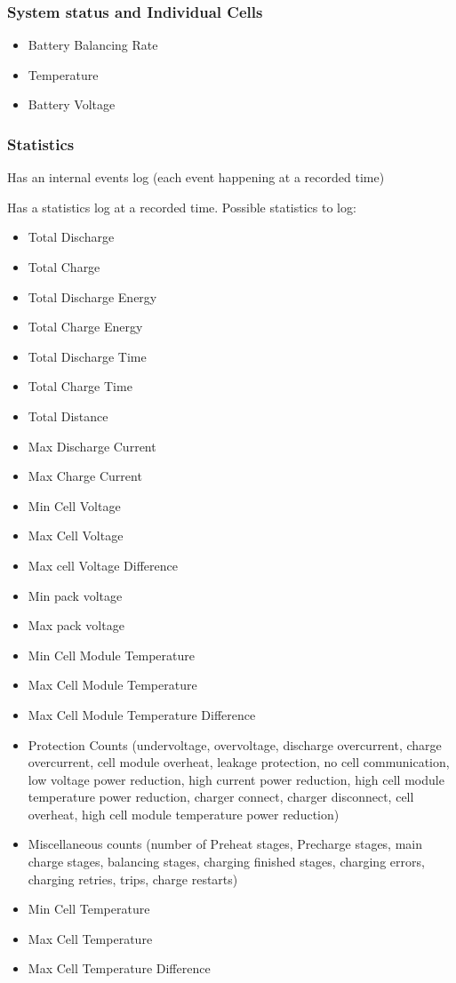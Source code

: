 \subsubsection{System status and Individual Cells}
\begin{itemize}
	\item Battery Balancing Rate
	\item Temperature
	\item Battery Voltage
\end{itemize}

\subsubsection{Statistics}
Has an internal events log (each event happening at a recorded time)

Has a statistics log at a recorded time. Possible statistics to log:
\begin{itemize}
	\item Total Discharge
	\item Total Charge
	\item Total Discharge Energy
	\item Total Charge Energy
	\item Total Discharge Time
	\item Total Charge Time
	\item Total Distance
	\item Max Discharge Current
	\item Max Charge Current
	\item Min Cell Voltage
	\item Max Cell Voltage
	\item Max cell Voltage Difference
	\item Min pack voltage
	\item Max pack voltage
	\item Min Cell Module Temperature
	\item Max Cell Module Temperature
	\item Max Cell Module Temperature Difference
	\item Protection Counts (undervoltage, overvoltage, discharge overcurrent, charge overcurrent, cell module overheat, leakage protection, no cell communication, low voltage power reduction, high current power reduction, high cell module temperature power reduction, charger connect, charger disconnect, cell overheat, high cell module temperature power reduction)
	\item Miscellaneous counts (number of Preheat stages, Precharge stages, main charge stages, balancing stages, charging finished stages, charging errors, charging retries, trips, charge restarts)
	\item Min Cell Temperature
	\item Max Cell Temperature
	\item Max Cell Temperature Difference
\end{itemize}
